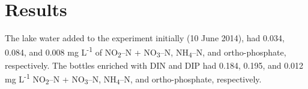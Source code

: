 \section{Results}

The lake water added to the experiment initially (10 June 2014), had 0.034, 0.084, and 0.008 mg L\textsuperscript{-1} of NO\textsubscript{2}--N + NO\textsubscript{3}--N, NH\textsubscript{4}--N, and ortho-phosphate, respectively. The bottles enriched with DIN and DIP had 0.184, 0.195, and 0.012 mg L\textsuperscript{-1} NO\textsubscript{2}--N + NO\textsubscript{3}--N, NH\textsubscript{4}--N, and ortho-phosphate, respectively.



    